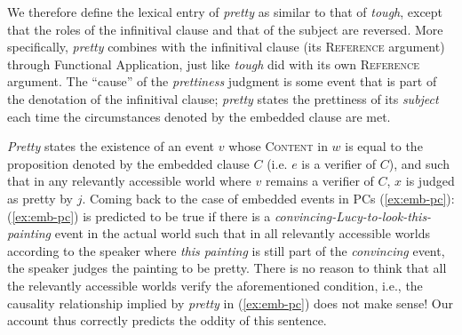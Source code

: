 \documentclass[11pt]{article}
\begin{document}
We therefore define the lexical entry of \textit{{pretty}} as similar to that of \textit{{tough}}, except that the roles of the infinitival clause and that of the subject are reversed. More specifically, \textit{{pretty}} combines with the infinitival clause (its \textsc{Reference} argument) through Functional Application, just like \textit{tough} did with its own \textsc{Reference} argument. The ``cause'' of the \textit{prettiness} judgment is some event that is part of the denotation of the infinitival clause; \textit{{pretty}} states the prettiness of its \textit{subject} each time the circumstances denoted by the embedded clause are met. 
\begin{center}
\end{center}
\textit{Pretty} states the existence of an event $v$ whose \textsc{Content} in $w$ is equal to the proposition denoted by the embedded clause $C$ (i.e. $e$ is a verifier of $C$), and such that in any relevantly accessible world where $v$ remains a verifier of $C$, $x$ is judged as pretty by $j$. Coming back to the case of embedded events in PCs (\ref{ex:emb-pc}):
(\ref{ex:emb-pc}) is predicted to be true if there is a \textit{convincing-Lucy-to-look-this-painting} event in the actual world such that in all relevantly accessible worlds according to the speaker where \textit{this painting} is still part of the \textit{convincing} event, the speaker judges the painting to be pretty. There is no reason to think that all the relevantly accessible worlds verify the aforementioned condition, i.e., the causality relationship implied by \textit{pretty} in (\ref{ex:emb-pc}) does not make sense! Our account thus correctly predicts the oddity of this sentence.
\end{document}
